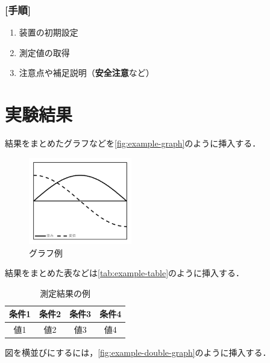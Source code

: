 \documentclass[lualatex,ja=standard]{bxjsarticle}
\begin{document}
\subsubsection*{[手順]}

\begin{enumerate}
  \item 装置の初期設定
  \item 測定値の取得
  \item 注意点や補足説明（\textbf{安全注意}など）
\end{enumerate}

\section{実験結果}

結果をまとめたグラフなどを\autoref{fig:example-graph}のように挿入する．

\begin{figure}[htbp]
  \centering
  \includegraphics[width=0.4\textwidth]{img/BN/graph.png}
  \caption{グラフ例}
  \label{fig:example-graph}
\end{figure}

結果をまとめた表などは\autoref{tab:example-table}のように挿入する．

\begin{table}[htbp]
  \centering
  \caption{測定結果の例}
  \label{tab:example-table}
  \begin{tabular}{cccc}
    \toprule
    条件1 & 条件2 & 条件3 & 条件4 \\
    \midrule
    値1 & 値2 & 値3 & 値4 \\
    \bottomrule
  \end{tabular}
\end{table}

図を横並びにするには，\autoref{fig:example-double-graph}のように挿入する．
\end{document}
